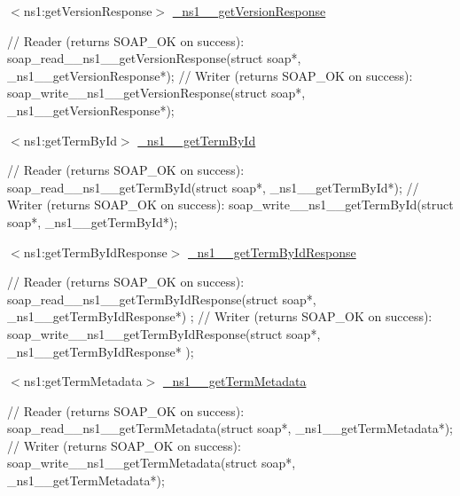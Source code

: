 \begin{DoxyItemize}
\item $<$ns1:getVersionResponse$>$ \hyperlink{class__ns1____getVersionResponse}{\_\-ns1\_\-\_\-getVersionResponse} 
\begin{DoxyCode}
    // Reader (returns SOAP_OK on success):
    soap_read__ns1__getVersionResponse(struct soap*, _ns1__getVersionResponse*);
    // Writer (returns SOAP_OK on success):
    soap_write__ns1__getVersionResponse(struct soap*, _ns1__getVersionResponse*);
      
\end{DoxyCode}

\end{DoxyItemize}


\begin{DoxyItemize}
\item $<$ns1:getTermById$>$ \hyperlink{class__ns1____getTermById}{\_\-ns1\_\-\_\-getTermById} 
\begin{DoxyCode}
    // Reader (returns SOAP_OK on success):
    soap_read__ns1__getTermById(struct soap*, _ns1__getTermById*);
    // Writer (returns SOAP_OK on success):
    soap_write__ns1__getTermById(struct soap*, _ns1__getTermById*);
\end{DoxyCode}

\end{DoxyItemize}


\begin{DoxyItemize}
\item $<$ns1:getTermByIdResponse$>$ \hyperlink{class__ns1____getTermByIdResponse}{\_\-ns1\_\-\_\-getTermByIdResponse} 
\begin{DoxyCode}
    // Reader (returns SOAP_OK on success):
    soap_read__ns1__getTermByIdResponse(struct soap*, _ns1__getTermByIdResponse*)
      ;
    // Writer (returns SOAP_OK on success):
    soap_write__ns1__getTermByIdResponse(struct soap*, _ns1__getTermByIdResponse*
      );
\end{DoxyCode}

\end{DoxyItemize}


\begin{DoxyItemize}
\item $<$ns1:getTermMetadata$>$ \hyperlink{class__ns1____getTermMetadata}{\_\-ns1\_\-\_\-getTermMetadata} 
\begin{DoxyCode}
    // Reader (returns SOAP_OK on success):
    soap_read__ns1__getTermMetadata(struct soap*, _ns1__getTermMetadata*);
    // Writer (returns SOAP_OK on success):
    soap_write__ns1__getTermMetadata(struct soap*, _ns1__getTermMetadata*);
\end{DoxyCode}

\end{DoxyItemize}



